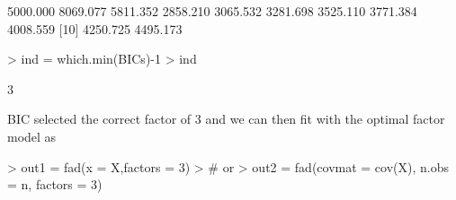 \documentclass{article}
\begin{document}
\begin{Schunk}
\begin{Soutput}
 [1] 5000.000 8069.077 5811.352 2858.210 3065.532 3281.698 3525.110 3771.384 4008.559
[10] 4250.725 4495.173
\end{Soutput}
\begin{Sinput}
> ind = which.min(BICs)-1
> ind
\end{Sinput}
\begin{Soutput}
[1] 3
\end{Soutput}
\end{Schunk}

BIC selected the correct factor of 3 and we can then fit with the optimal factor model as
\begin{Schunk}
\begin{Sinput}
> out1 = fad(x = X,factors = 3)
> # or
> out2 = fad(covmat = cov(X), n.obs = n, factors = 3)
\end{Sinput}
\end{Schunk}
\end{document}

